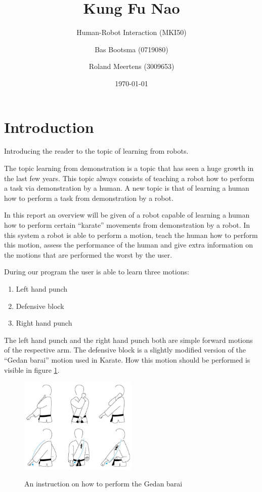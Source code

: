 \documentclass[10pt,a4paper,oneside]{scrartcl}
\begin{document}
\title{Kung Fu Nao}
\subtitle{Human-Robot Interaction (MKI50)}

\author{ Bas Bootsma (0719080) \and Roland Meertens (3009653)}

\date{\today}

\maketitle

\section{Introduction}
Introducing the reader to the topic of learning from robots. 

The topic learning from demonstration is a topic that has seen a huge growth in the last few years.
This topic always consists of teaching a robot how to perform a task via demonstration by a human.  
A new topic is that of learning a human how to perform a task from demonstration by a robot. 

In this report an overview will be given of a robot capable of learning a human how to perform certain ``karate'' movements from demonstration by a robot. 
In this system a robot is able to perform a motion, teach the human how to perform this motion, assess the performance of the human and give extra information on the motions that are performed the worst by the user. 

During our program the user is able to learn three motions: 
\begin{enumerate}
  \item Left hand punch
  \item Defensive block
  \item Right hand punch
\end{enumerate}
The left hand punch and the right hand punch both are simple forward motions of the respective arm. 
The defensive block is a slightly modified version of the ``Gedan barai'' motion used in Karate. 
How this motion should be performed is visible in figure \ref{fig:gedanBarai}. 

\begin{figure}[h!]
	\caption{An instruction on how to perform the Gedan barai}
	\centering
	\includegraphics[width=0.5\textwidth]{images/gedanBarai}
	\label{fig:gedanBarai}
\end{figure}
\end{document}
